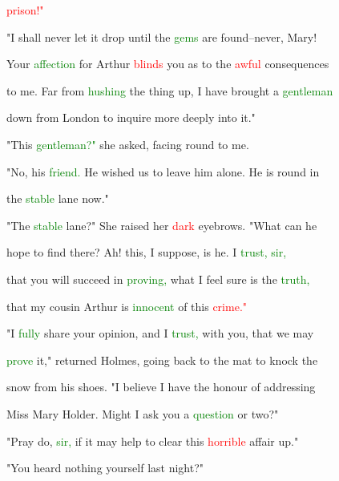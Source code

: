  \textcolor{red}{prison!"}



 "I shall never let it drop until the \textcolor{green}{gems} are found--never, Mary!

 Your \textcolor{green}{affection} for Arthur \textcolor{red}{blinds} you as to the \textcolor{red}{awful} consequences

 to me. Far from \textcolor{green}{hushing} the thing up, I have brought a \textcolor{green}{gentleman}

 down from London to inquire more deeply into it."



 "This \textcolor{green}{gentleman?"} she asked, facing round to me.



 "No, his \textcolor{green}{friend.} He wished us to \textcolor{BurntOrange}{leave} him alone. He is round in

 the \textcolor{green}{stable} lane now."



 "The \textcolor{green}{stable} lane?" She raised her \textcolor{red}{dark} eyebrows. "What can he

 \textcolor{BurntOrange}{hope} to find there? Ah! this, I suppose, is he. I \textcolor{green}{trust,} \textcolor{green}{sir,}

 that you will \textcolor{BurntOrange}{succeed} in \textcolor{green}{proving,} what I feel sure is the \textcolor{green}{truth,}

 that my cousin Arthur is \textcolor{green}{innocent} of this \textcolor{red}{crime."}



 "I \textcolor{green}{fully} \textcolor{BurntOrange}{share} your opinion, and I \textcolor{green}{trust,} with you, that we may

 \textcolor{green}{prove} it," returned Holmes, going back to the mat to knock the

 snow from his shoes. "I believe I have the honour of addressing

 Miss Mary Holder. Might I ask you a \textcolor{green}{question} or two?"



 \textcolor{BurntOrange}{"Pray} do, \textcolor{green}{sir,} if it may help to clear this \textcolor{red}{horrible} affair up."



 "You heard nothing yourself last night?"



